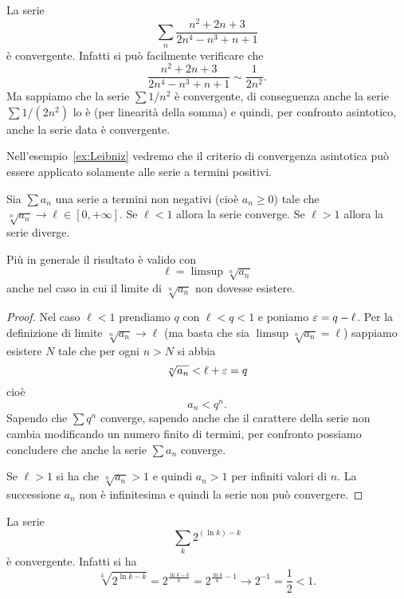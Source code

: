 \begin{example}
La serie
\[
\sum_n \frac{n^2+2n+3}{2n^4-n^3+n+1}
\]
è convergente. Infatti si può facilmente verificare che
\[
   \frac{n^2+2n+3}{2n^4-n^3+n+1} \sim \frac{1}{2n^2}.
\]
Ma sappiamo che la serie $\sum 1/n^2$ è convergente, di conseguenza
anche la serie $\sum 1/(2n^2)$ lo è (per linearità della somma)
e quindi, per confronto
asintotico, anche la serie data è convergente.
\end{example}

Nell'esempio~\ref{ex:Leibniz} vedremo che il criterio di convergenza 
asintotica può essere applicato solamente alle serie a termini positivi.

\begin{theorem}
Sia $\sum a_n$ una serie a termini non negativi
(cioè $a_n\ge 0$) tale che
\mymark{***}
$\sqrt[n]{a_n} \to \ell \in [0,+\infty]$.
Se $\ell<1$ allora la serie converge.
Se $\ell>1$ allora la serie diverge.

Più in generale il risultato è valido con
\[
  \ell = \limsup \sqrt[n]{a_n}
\]
anche nel caso in cui il limite di $\sqrt[n]{a_n}$ non dovesse esistere.
\end{theorem}
%
\begin{proof}
\mymark{***}
Nel caso $\ell < 1$
prendiamo $q$ con $\ell < q < 1$ e poniamo $\varepsilon = q-\ell$.
Per la definizione di limite $\sqrt[n]{a_n}\to \ell$
(ma basta che sia $\limsup \sqrt[n]{a_n}=\ell$)
sappiamo
esistere $N$ tale che per ogni $n > N$ si abbia
\[
  \sqrt[n]{a_n} < \ell + \varepsilon = q
\]
cioè
\[
   a_n < q^n.
\]
Sapendo che $\sum q^n$ converge, sapendo anche che il carattere
della serie non cambia modificando un numero finito di termini,
per confronto possiamo concludere che anche la serie $\sum a_n$ converge.

Se $\ell>1$ si ha che $\sqrt[n]{a_n}>1$ e quindi $a_n>1$ per infiniti valori di $n$. La successione $a_n$ non è infinitesima e quindi la serie non può convergere.
\end{proof}

\begin{example}
La serie
\[
  \sum_k 2^{(\ln k) - k}
\]
è convergente. Infatti si ha
\[
 \sqrt[k]{2^{\ln k - k}}
 = 2^{\frac{\ln k - k}{k}}
 = 2^{\frac{\ln k }k - 1}
 \to 2^{-1}
 = \frac{1}{2}
 < 1.
\]
\end{example}

